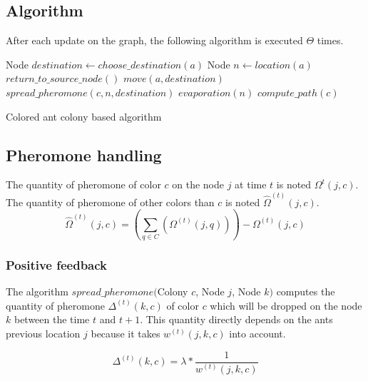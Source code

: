 \documentclass[a4paper,10pt]{article}
\begin{document}
\subsection{Algorithm}

After each update on the graph, the following algorithm is executed $\Theta$ times.\\

\begin{algorithm}[h]
\begin{algorithmic} 
\label{algo1}
\STATE Node $destination \leftarrow choose\_destination(a)$
\STATE Node $n \leftarrow location(a)$
\STATE $return\_to\_source\_node()$
\ELSE
\STATE $move(a, destination)$
\STATE $spread\_pheromone(c, n, destination)$
\ENDIF
\ENDFOR
{}
\STATE $evaporation(n)$
\ENDFOR
{}
\STATE $compute\_path(c)$
\ENDFOR
\end{algorithmic}
\caption{Colored ant colony based algorithm}
\end{algorithm}




\subsection{Pheromone handling}
The quantity of pheromone of color $c$ on the node $j$ at time $t$ is noted $\Omega^{t}(j,c)$. The quantity of pheromone of other colors than $c$ is noted $\hat \Omega^{(t)}(j,c)$.
\begin{equation*}
    \hat \Omega^{(t)}(j,c) = \left( \sum_{q \in C}(\Omega^{(t)} (j,q)) \right) - \Omega^{(t)} (j,c)
\end{equation*}



\subsubsection{Positive feedback}
The algorithm $spread\_pheromone($Colony $c$, Node $j$, Node $k)$ computes the quantity of pheromone $\Delta^{(t)}(k,c)$ of color $c$  which will be dropped on the node $k$ between the time $t$ and $t+1$. This quantity directly depends on the ants previous location $j$ because it takes $w^{(t)}(j,k,c)$ into account.

\begin{equation*}
 \Delta^{(t)}(k,c) = \lambda * \frac{1}{w^{(t)}(j,k,c)}
\end{equation*}
\end{document}
